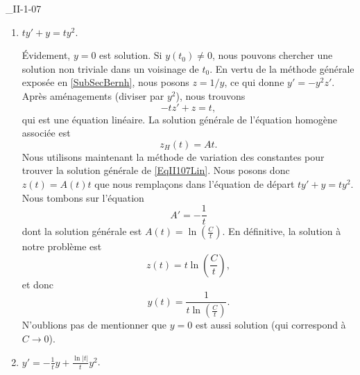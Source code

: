 

\begin{corrige}{_II-1-07}

\begin{enumerate}

\item
$ty'+y=ty^2$. 

Évidement, $y=0$ est solution. Si $y(t_0)\neq 0$, nous pouvons chercher une solution non triviale dans un voisinage de $t_0$. En vertu de la méthode générale exposée en \ref{SubSecBernh}, nous posons $z=1/y$, ce qui donne $y'=-y^2z'$. Après aménagements (diviser par $y^2$), nous trouvons
\begin{equation}		\label{EqII107Lin}
	-tz'+z=t,
\end{equation}
qui est une équation linéaire. La solution générale de l'équation homogène associée est
\begin{equation}
	z_H(t)=At.
\end{equation}
Nous utilisons maintenant la méthode de variation des constantes pour trouver la solution générale de \eqref{EqII107Lin}. Nous posons donc $z(t)=A(t)t$ que nous remplaçons dans l'équation de départ $ty'+y=ty^2$. Nous tombons sur l'équation
\begin{equation}
	A'=-\frac{1}{ t }
\end{equation}
dont la solution générale est $A(t)=\ln\left( \frac{ C }{ t } \right)$. En définitive, la solution à notre problème est
\begin{equation}
	z(t)=t\ln\left( \frac{ C }{ t } \right),
\end{equation}
et donc
\begin{equation}
	y(t)=\frac{1}{ t\ln\left( \frac{ C }{ t } \right) }.
\end{equation}
N'oublions pas de mentionner que $y=0$ est aussi solution (qui correspond à $C\to 0$).

\item
$y'=-\frac{1}{ t }y+\frac{ \ln| t | }{ t }y^2$.


\end{enumerate}
\end{corrige}
